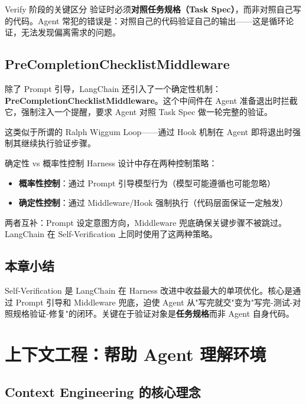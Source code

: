 \documentclass[a4paper]{article}
\begin{document}
\begin{warningbox}{Verify 阶段的关键区分}
验证时必须\textbf{对照任务规格（Task Spec）}，而非对照自己写的代码。Agent 常犯的错误是：对照自己的代码验证自己的输出——这是循环论证，无法发现偏离需求的问题。
\end{warningbox}

\subsection{PreCompletionChecklistMiddleware}

除了 Prompt 引导，LangChain 还引入了一个确定性机制：\textbf{PreCompletionChecklistMiddleware}。这个中间件在 Agent 准备退出时拦截它，强制注入一个提醒，要求 Agent 对照 Task Spec 做一轮完整的验证。

这类似于所谓的 Ralph Wiggum Loop——通过 Hook 机制在 Agent 即将退出时强制其继续执行验证步骤。

\begin{knowledgebox}{确定性 vs 概率性控制}
Harness 设计中存在两种控制策略：
\begin{itemize}[leftmargin=1.5em]
    \item \textbf{概率性控制}：通过 Prompt 引导模型行为（模型可能遵循也可能忽略）
    \item \textbf{确定性控制}：通过 Middleware/Hook 强制执行（代码层面保证一定触发）
\end{itemize}
两者互补：Prompt 设定意图方向，Middleware 兜底确保关键步骤不被跳过。LangChain 在 Self-Verification 上同时使用了这两种策略。
\end{knowledgebox}

\subsection{本章小结}

Self-Verification 是 LangChain 在 Harness 改进中收益最大的单项优化。核心是通过 Prompt 引导和 Middleware 兜底，迫使 Agent 从"写完就交"变为"写完-测试-对照规格验证-修复"的闭环。关键在于验证对象是\textbf{任务规格}而非 Agent 自身代码。


\section{上下文工程：帮助 Agent 理解环境}

\subsection{Context Engineering 的核心理念}
\end{document}
